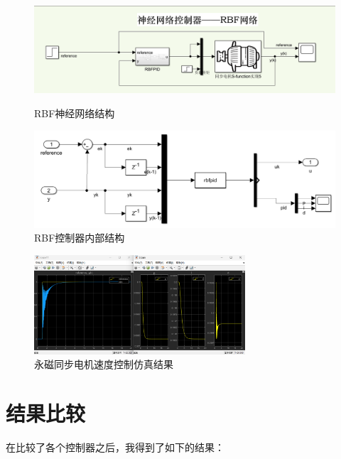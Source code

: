 \documentclass[12pt,a4paper,UTF8]{article}
\begin{document}
\begin{figure}[htbp]
    \begin{minipage}{0.48\textwidth}
        \centering
        \includegraphics[width=\textwidth]{2024-12-30-13-58-24.png}
        \caption{RBF神经网络结构}\label{fig:rbf_simulink}
    \end{minipage}
    \hfill
    \begin{minipage}{0.48\textwidth}
        \centering
        \includegraphics[width=\textwidth]{2024-12-30-14-00-16.png}
        \caption{RBF控制器内部结构}
    \end{minipage}
\end{figure}


\begin{figure}[htbp] \centering \includegraphics[width=0.7\textwidth]{2024-12-30-14-05-25.png} \caption{永磁同步电机速度控制仿真结果} \label{fig:rbf}\end{figure}

\clearpage
\section{结果比较}

在比较了各个控制器之后，我得到了如下的结果：
\end{document}
